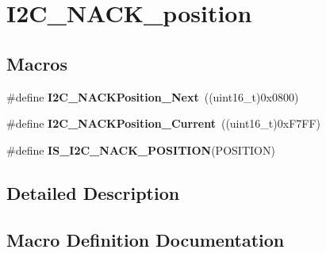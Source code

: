 \hypertarget{group___i2_c___n_a_c_k__position}{}\section{I2\+C\+\_\+\+N\+A\+C\+K\+\_\+position}
\label{group___i2_c___n_a_c_k__position}
\subsection*{Macros}
\begin{DoxyCompactItemize}
\item 
\hypertarget{group___i2_c___n_a_c_k__position_gacb512a4bd4841a763b6ec51606687fca}{}\#define {\bfseries I2\+C\+\_\+\+N\+A\+C\+K\+Position\+\_\+\+Next}~((uint16\+\_\+t)0x0800)\label{group___i2_c___n_a_c_k__position_gacb512a4bd4841a763b6ec51606687fca}

\item 
\hypertarget{group___i2_c___n_a_c_k__position_ga8d91c1e62730a9d927ca8e9ec4f7ef8f}{}\#define {\bfseries I2\+C\+\_\+\+N\+A\+C\+K\+Position\+\_\+\+Current}~((uint16\+\_\+t)0x\+F7\+F\+F)\label{group___i2_c___n_a_c_k__position_ga8d91c1e62730a9d927ca8e9ec4f7ef8f}

\item 
\#define {\bfseries I\+S\+\_\+\+I2\+C\+\_\+\+N\+A\+C\+K\+\_\+\+P\+O\+S\+I\+T\+I\+O\+N}(P\+O\+S\+I\+T\+I\+O\+N)
\end{DoxyCompactItemize}


\subsection{Detailed Description}


\subsection{Macro Definition Documentation}
\hypertarget{group___i2_c___n_a_c_k__position_ga631b4b1674a12aa2b3b27360983029e3}{}
